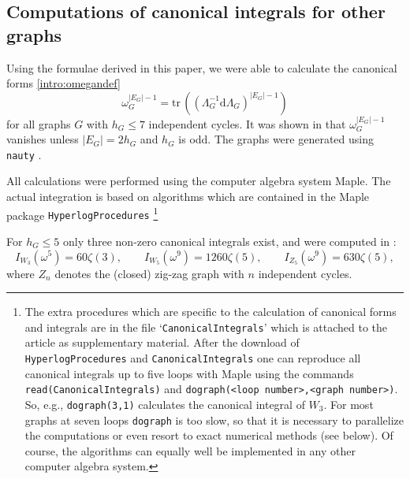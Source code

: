 \documentclass[10pt]{amsart}
\newcommand{\dd}{\mathrm{d}}
\newcommand{\tr}{\mathrm{tr}\,}
\theoremstyle{plain}
\newcommand{\0}{\color{blue}{\mathsf{0}}}
\begin{document}
\subsection{Computations of canonical integrals for other graphs}
\label{sectcalc} Using the formulae  derived in this paper, we  were able to calculate the canonical  forms  \eqref{intro:omegandef}
\[ \omega^{|E_G|-1}_G = \tr( (\Lambda_G^{-1} \dd \Lambda_G )^{|E_G|-1}) \]
for all  graphs $G$ with $h_G\leq7$ independent cycles. It was shown in \cite{BrSigma} that $\omega_G^{|E_G|-1}$ vanishes unless $|E_G| = 2h_G$ and $h_G$ is odd.  The graphs were generated using {\tt nauty} \cite{NAUTY}.

All calculations were performed using the computer algebra system Maple.
The actual integration is based on algorithms which are
contained in the Maple package {\tt HyperlogProcedures} \cite{hlog}\footnote{
The extra procedures which are specific to the calculation of canonical forms
and integrals are in the file `{\tt CanonicalIntegrals}' which is attached to the article
as supplementary material. After the download of {\tt HyperlogProcedures}
and {\tt CanonicalIntegrals} one can reproduce all canonical integrals up to five loops
with Maple using the commands {\tt read(CanonicalIntegrals)} and {\tt dograph(<loop number>,<graph number>)}. So, e.g., {\tt dograph(3,1)} calculates the canonical integral
of $W_3$. For most graphs at seven loops {\tt dograph} is too slow, so that it is necessary
to parallelize the computations or even  resort to exact numerical methods (see below).
Of course, the algorithms can equally well be implemented in any other computer algebra
system.}

For $h_G\leq5$ only three non-zero canonical  integrals exist, and  were computed in \cite{BrSigma}: 
$$
I_{W_3}(\omega^5)=60\zeta(3),\qquad I_{W_5}(\omega^9)=1260\zeta(5),\qquad I_{Z_5}(\omega^9)=630\zeta(5),
$$
where $Z_n$ denotes the (closed) zig-zag graph with $n$ independent cycles. 
\end{document}
